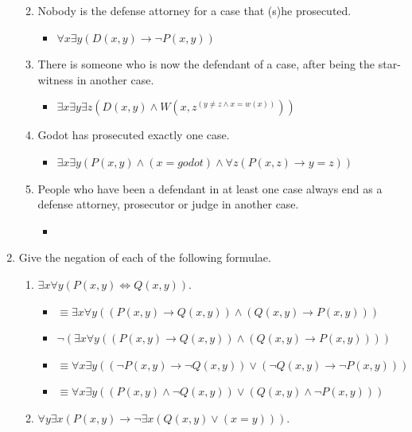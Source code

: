 \documentclass[a4paper]{article}
\begin{document}
\begin{enumerate}
\begin{enumerate}
\begin{itemize}
        \end{itemize}
        \item Nobody is the defense attorney for a case that (s)he prosecuted.
        \begin{itemize}
            \item $\forall x \exists y ( D(x,y) \to \neg P(x,y))$
        \end{itemize}
        \item There is someone who is now the defendant of a case, after being the star-witness in another case.
        \begin{itemize}
            \item $\exists x \exists y \exists z (D(x,y) \land W(x,z ^ (y \neq z \land x = w(x)))) $
        \end{itemize}
        \item Godot has prosecuted exactly one case.
        \begin{itemize}
            \item $\exists x \exists y (P(x,y) \land (x = godot) \land \forall z (P(x,z) \to y = z))$
        \end{itemize}
        \item People who have been a defendant in at least one case always end as a defense attorney, prosecutor or judge in another case.
        \begin{itemize}
            \item 
        \end{itemize}
    \end{enumerate}
    \item Give the negation of each of the following formulae.
    \begin{enumerate}
        \item $\exists x\forall y(P(x,y)\iff Q(x,y))$.
        \begin{itemize}
            \item $\equiv \exists x\forall y((P(x,y) \to Q(x,y)) \land (Q(x,y) \to P(x,y)))$
            \item $\neg (\exists x\forall y((P(x,y) \to Q(x,y)) \land (Q(x,y) \to P(x,y))))$
            \item $\equiv \forall x\exists y((\neg P(x,y) \to \neg Q(x,y)) \lor (\neg Q(x,y) \to \neg P(x,y)))$
            \item $\equiv \forall x\exists y(( P(x,y) \land \neg Q(x,y)) \lor (Q(x,y) \land \neg P(x,y)))$
        \end{itemize}
        \item $\forall y\exists x(P(x,y)\to\neg\exists x(Q(x,y)\vee(x=y)))$.

\end{enumerate}
\end{enumerate}
\end{document}
